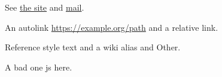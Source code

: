 See \href{https://example.com/a_b?x=1&y=2\#top}{the site} and \href{mailto:a@b.org}{mail}.

An autolink \href{https://example.org/path}{https://example.org/path} and a relative link.

Reference style text and a wiki alias and Other.

A bad one js here.
